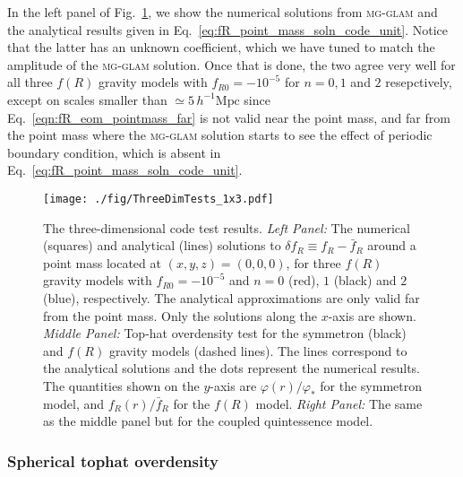 In the left panel of Fig.~\ref{fig:CodeTests3D}, we show the numerical solutions from \textsc{mg-glam} and the analytical results given in Eq.~\eqref{eq:fR_point_mass_soln_code_unit}. Notice that the latter has an unknown coefficient, which we have tuned to match the amplitude of the \textsc{mg-glam} solution. Once that is done, the two agree very well for all three $f(R)$ gravity models with $f_{R0}=-10^{-5}$ for $n = 0, 1$ and $2$ resepctively, except on scales smaller than $\simeq 5 \, h^{-1} \mathrm{Mpc}$ since Eq.~\eqref{eqn:fR_eom_pointmass_far} is not valid near the point mass, and far from the point mass where the \textsc{mg-glam} solution starts to see the effect of periodic boundary condition, which is absent in Eq.~\eqref{eq:fR_point_mass_soln_code_unit}.

\begin{figure}
    \centering 
    \texttt{[image: ./fig/ThreeDimTests\_1x3.pdf]}
    \caption{The three-dimensional code test results. 
    \textit{Left Panel:} The numerical (squares) and analytical (lines) solutions to $\delta f_R \equiv f_R - \bar{f}_R$ around a point mass located at $(x,y,z)=(0,0,0)$, for three $f(R)$ gravity models with $f_{R0} = -10^{-5}$ and $n = 0$ (red), $1$ (black) and $2$ (blue), respectively. The analytical approximations are only valid far from the point mass. Only the solutions along the $x$-axis are shown. 
    \textit{Middle Panel:} Top-hat overdensity test for the symmetron (black) and $f(R)$ gravity models (dashed lines). 
    The lines correspond to the analytical solutions and the dots represent the numerical results. 
    The quantities shown on the $y$-axis are $\varphi (r) / \varphi_*$ for the symmetron model, and $f_R (r) / \bar{f}_R$ for the $f(R)$ model.
    \textit{Right Panel:} The same as the middle panel but for the coupled quintessence model.
    }
    \label{fig:CodeTests3D}
\end{figure}


\subsubsection*{Spherical tophat overdensity}

